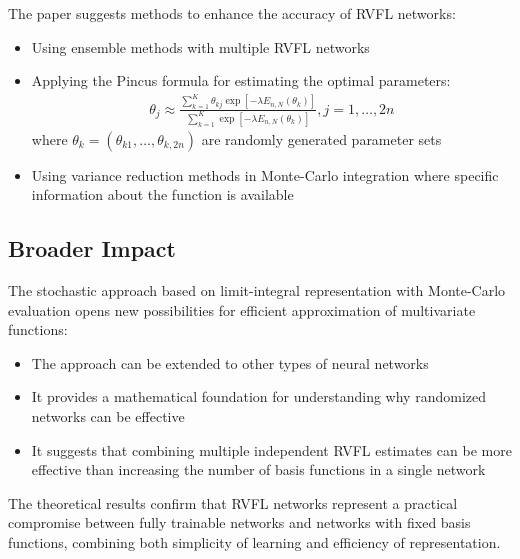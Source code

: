 \documentclass[11pt]{article}
\begin{document}
The paper suggests methods to enhance the accuracy of RVFL networks:

\begin{itemize}
    \item Using ensemble methods with multiple RVFL networks
    \item Applying the Pincus formula for estimating the optimal parameters:
    \begin{align}
    \theta_j \approx \frac{\sum_{k=1}^K \theta_{kj} \exp[-\lambda E_{n,N}(\theta_k)]}{\sum_{k=1}^K \exp[-\lambda E_{n,N}(\theta_k)]}, j=1,\ldots,2n
    \end{align}
    where $\theta_k = (\theta_{k1},\ldots,\theta_{k,2n})$ are randomly generated parameter sets
    \item Using variance reduction methods in Monte-Carlo integration where specific information about the function is available
\end{itemize}

\subsection{Broader Impact}

The stochastic approach based on limit-integral representation with Monte-Carlo evaluation opens new possibilities for efficient approximation of multivariate functions:

\begin{itemize}
    \item The approach can be extended to other types of neural networks
    \item It provides a mathematical foundation for understanding why randomized networks can be effective
    \item It suggests that combining multiple independent RVFL estimates can be more effective than increasing the number of basis functions in a single network
\end{itemize}

The theoretical results confirm that RVFL networks represent a practical compromise between fully trainable networks and networks with fixed basis functions, combining both simplicity of learning and efficiency of representation.
\end{document}
